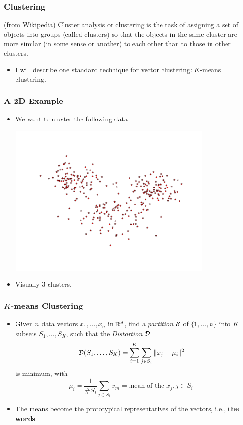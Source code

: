 \documentclass[10pt]{beamer}
\begin{document}
\begin{frame}
  \frametitle{Clustering}
  \begin{definition}
    (from Wikipedia) Cluster analysis or clustering is the task of
    assigning a set of objects into groups (called clusters) so that
    the objects in the same cluster are more similar (in some sense
    or another) to each other than to those in other clusters.
  \end{definition}
  
  \vfill
  \begin{itemize}
  \item
    I will describe one standard technique for vector clustering: $K$-means clustering.
  \end{itemize}
\end{frame}


\begin{frame}
  \frametitle{A 2D Example}
  \begin{itemize}
  \item We want to cluster the following data
    \begin{center}
      \includegraphics[width=0.8\textwidth]{FIGURES/2DData}
    \end{center}
  \item Visually 3 clusters.
  \end{itemize}
\end{frame}

\begin{frame}
  \frametitle{$K$-means Clustering}
  \begin{itemize}
  \item
    Given $n$ data vectors $x_1,\dots,x_n$ in ${\mathbb R}^d$, find a
    \emph{partition} ${\mathcal S}$ of $\{1,\dots,n\}$ into $K$ subsets
    $S_1,\dots,S_K$, such that the \emph{Distortion} ${\mathcal D}$
    $$
    {\mathcal D}(S_1,\dots,S_K) = \sum_{i = 1}^K\sum_{j\in S_i} \|x_j -\mu_i\|^2
    $$
    is minimum, with
    $$
    \mu_i = \frac{1}{\#S_i}\sum_{j\in S_i}x_m = \text{mean of the }x_j, j\in S_i.
    $$
  \item The means become the prototypical representatives of the vectors, i.e., \textbf{the words}
  \end{itemize}
\end{frame}
\end{document}

